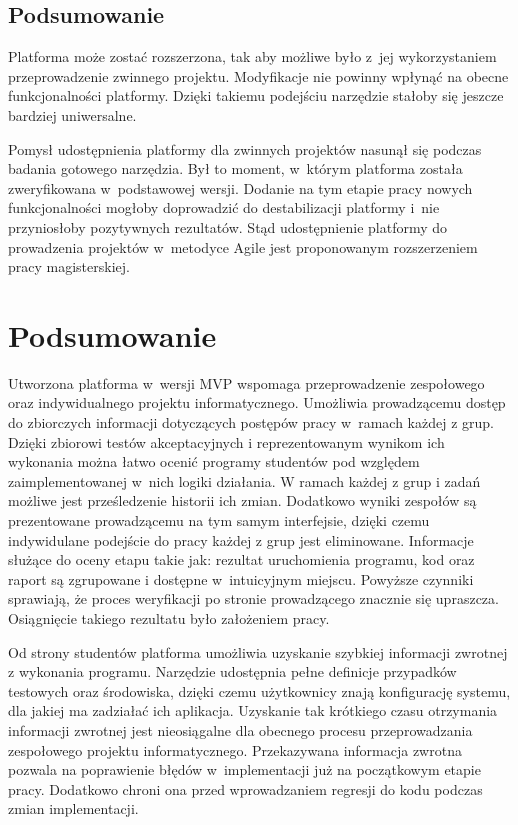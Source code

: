 \subsection{Podsumowanie}

Platforma może zostać rozszerzona, tak aby możliwe było z~jej wykorzystaniem przeprowadzenie zwinnego projektu.
Modyfikacje nie powinny wpłynąć na obecne funkcjonalności platformy.
Dzięki takiemu podejściu narzędzie stałoby się jeszcze bardziej uniwersalne.

Pomysł udostępnienia platformy dla zwinnych projektów nasunął się podczas badania gotowego narzędzia.
Był to moment, w~którym platforma została zweryfikowana w~podstawowej wersji.
Dodanie na tym etapie pracy nowych funkcjonalności mogłoby doprowadzić do destabilizacji platformy i~nie przyniosłoby pozytywnych rezultatów.
Stąd udostępnienie platformy do prowadzenia projektów w~metodyce Agile jest proponowanym rozszerzeniem pracy magisterskiej.


\section{Podsumowanie}
\label{research_summary}

Utworzona platforma w~wersji MVP wspomaga przeprowadzenie zespołowego oraz indywidualnego projektu informatycznego.
Umożliwia prowadzącemu dostęp do zbiorczych informacji dotyczących postępów pracy w~ramach każdej z grup.
Dzięki zbiorowi testów akceptacyjnych i reprezentowanym wynikom ich wykonania można łatwo ocenić programy studentów pod względem zaimplementowanej w~nich logiki działania.
W ramach każdej z grup i zadań możliwe jest prześledzenie historii ich zmian.
Dodatkowo wyniki zespołów są prezentowane prowadzącemu na tym samym interfejsie, dzięki czemu indywidulane podejście do pracy każdej z grup jest eliminowane.
Informacje służące do oceny etapu takie jak: rezultat uruchomienia programu, kod oraz raport są zgrupowane i dostępne w~intuicyjnym miejscu.
Powyższe czynniki sprawiają, że proces weryfikacji po stronie prowadzącego znacznie się upraszcza.
Osiągnięcie takiego rezultatu było założeniem pracy.

Od strony studentów platforma umożliwia uzyskanie szybkiej informacji zwrotnej z wykonania programu.
Narzędzie udostępnia pełne definicje przypadków testowych oraz środowiska, dzięki czemu użytkownicy znają konfigurację systemu, dla jakiej ma zadziałać ich aplikacja.
Uzyskanie tak krótkiego czasu otrzymania informacji zwrotnej jest nieosiągalne dla obecnego procesu przeprowadzania zespołowego projektu informatycznego.
Przekazywana informacja zwrotna pozwala na poprawienie błędów w~implementacji już na początkowym etapie pracy.
Dodatkowo chroni ona przed wprowadzaniem regresji do kodu podczas zmian implementacji.

